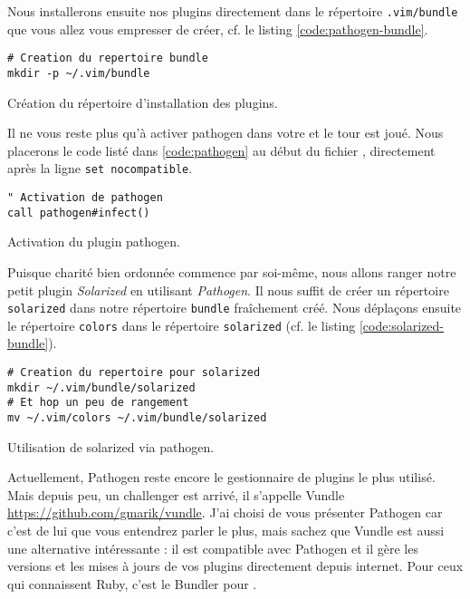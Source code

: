 Nous installerons ensuite nos plugins directement dans le répertoire \Verb|.vim/bundle| que vous allez vous empresser de créer, cf. le listing \ref{code:pathogen-bundle}.

\begin{listing}[H]
\begin{verbatim}
# Creation du repertoire bundle
mkdir -p ~/.vim/bundle
\end{verbatim}
  \caption{Création du répertoire d'installation des plugins.}
  \label{code:pathogen-bundle}
\end{listing}

Il ne vous reste plus qu'à activer pathogen dans votre \vimrc et le tour est joué. Nous placerons le code listé dans 
\ref{code:pathogen} au début du fichier \vimrc, directement après la ligne \Verb|set nocompatible|.

\begin{listing}[H]

\begin{verbatim}
" Activation de pathogen
call pathogen#infect()
\end{verbatim}
\caption{Activation du plugin pathogen.}
\label{code:pathogen}
\end{listing}

Puisque charité bien ordonnée commence par soi-même, nous allons ranger notre petit plugin \emph{Solarized} en utilisant \emph{Pathogen}. Il nous suffit de créer un répertoire \Verb|solarized| dans notre répertoire \Verb|bundle| fraîchement créé. Nous déplaçons ensuite le répertoire \Verb|colors| dans le répertoire \Verb|solarized| (cf. le listing \ref{code:solarized-bundle}).

\begin{listing}[H]
\begin{verbatim}
# Creation du repertoire pour solarized
mkdir ~/.vim/bundle/solarized
# Et hop un peu de rangement
mv ~/.vim/colors ~/.vim/bundle/solarized
\end{verbatim}
  \caption{Utilisation de solarized via pathogen.}
  \label{code:solarized-bundle}
\end{listing}

Actuellement, Pathogen reste encore le gestionnaire de plugins \vim le plus utilisé. Mais depuis peu, un challenger est arrivé, il s'appelle Vundle \url{https://github.com/gmarik/vundle}. J'ai choisi de vous présenter Pathogen car c'est de lui que vous entendrez parler le plus, mais sachez que Vundle est aussi une alternative intéressante : il est compatible avec Pathogen et il gère les versions et les mises à jours de vos plugins directement depuis internet. Pour ceux qui connaissent Ruby, c'est le Bundler  pour \vim.


